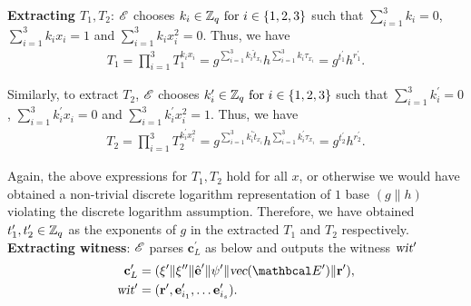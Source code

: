   
  
  \textbf{Extracting $T_1,T_2$}:  $\mathscr{E}$ chooses $k_i \in \mathbb{Z}_q \text{ for } i \in \{1,2,3\}$ such that $\sum_{i=1}^{3}k_i=0$, $\sum_{i=1}^{3}k_ix_i=1$ and $\sum_{i=1}^{3}k_ix_i^2=0$. Thus, we have
  \begin{gather*}
      T_1 = \prod_{i=1}^{3} T_1^{k_ix_i} = g^{\sum_{i=1}^{3} k_i \hat{t}_{x_i}} h^{\sum_{i=1}^{3} k_i \tau_{x_i}} = g^{t_1^{\prime}} h^{r_1^{\prime}}.
  \end{gather*}
  
  Similarly, to extract $T_2$, $\mathscr{E}$ chooses $k_i^{\prime} \in \mathbb{Z}_q \text{ for } i \in \{1,2,3\}$ such that $\sum_{i=1}^{3}k_i^{\prime}=0$, $\sum_{i=1}^{3}k_i^{\prime}x_i=0$ and $\sum_{i=1}^{3}k_i^{\prime}x_i^2=1$. Thus, we have
  \begin{gather*}
      T_2 = \prod_{i=1}^{3} T_2^{k_i^{\prime} x_i^2} = g^{\sum_{i=1}^{3} k_i^{\prime} \hat{t}_{x_i}} h^{\sum_{i=1}^{3} k_i^{\prime} \tau_{x_i}} = g^{t_2^{\prime}} h^{r_2^{\prime}}.
  \end{gather*}
  
  Again, the above expressions for $T_1, T_2$ hold for all $x$, or otherwise we would have obtained a non-trivial discrete logarithm representation of $1$ base $(g\|h)$ violating the discrete logarithm assumption.
  Therefore, we have obtained $t_1^{\prime}, t_2^{\prime} \in \mathbb{Z}_q$ as the exponents of $g$ in the extracted $T_1$ and $T_2$ respectively.\\
  
  \textbf{Extracting witness}: $\mathscr{E}$ parses $\textbf{c}_L^{\prime}$ as below and outputs the witness $\textsl{wit}^{\prime}$ 
  \begin{align*}
      \textbf{c}_L^{\prime} &= (\xi^{\prime} \| \xi^{\prime \prime} \| \hat{\textbf{e}}^{\prime} \| \psi^{\prime}\| \textsl{vec}(\Emat^{\prime}) \| \textbf{r}^{\prime}), \\
      \textsl{wit}^{\prime} &= (\textbf{r}^{\prime}, \textbf{e}_{i_1}^{\prime}, \dots \textbf{e}_{i_s}^{\prime}).
  \end{align*}
  
